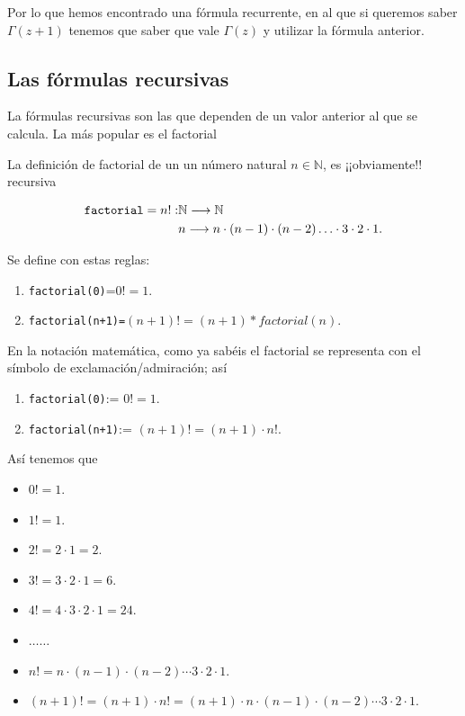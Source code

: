 \documentclass[
]{article}
\providecommand{\tightlist}{%
  \setlength{\itemsep}{0pt}\setlength{\parskip}{0pt}}
\begin{document}
Por lo que hemos encontrado una fórmula recurrente, en al que si
queremos saber \(\Gamma(z+1)\) tenemos que saber que vale \(\Gamma(z)\)
y utilizar la fórmula anterior.

\hypertarget{las-fuxf3rmulas-recursivas}{%
\subsection{Las fórmulas recursivas}\label{las-fuxf3rmulas-recursivas}}

La fórmulas recursivas son las que dependen de un valor anterior al que
se calcula. La más popular es el factorial

La definición de factorial de un un número natural \(n\in\mathbb{N}\),
es ¡¡obviamente!! recursiva

\[
\begin{aligned}
\verb+factorial+ = n!: & \mathbb{N} \longrightarrow  \mathbb{N}\\
& n \longrightarrow  n\cdot (n-1)\cdot (n-2) \ldots \cdot 3\cdot 2\cdot 1.
\end{aligned}
\]

Se define con estas reglas:

\begin{enumerate}
\def\labelenumi{\arabic{enumi}.}
\tightlist
\item
  \texttt{factorial(0)}=\(0!=1\).
\item
  \texttt{factorial(n+1)=}\((n+1)!=(n+1)*factorial(n).\)
\end{enumerate}

En la notación matemática, como ya sabéis el factorial se representa con
el símbolo de exclamación/admiración; así

\begin{enumerate}
\def\labelenumi{\arabic{enumi}.}
\tightlist
\item
  \texttt{factorial(0)}:= \(0!=1\).
\item
  \texttt{factorial(n+1)}:= \((n+1)!=(n+1)\cdot n!\).
\end{enumerate}

Así tenemos que

\begin{itemize}
\tightlist
\item
  \(0!=1.\)
\item
  \(1!=1.\)
\item
  \(2!= 2\cdot 1= 2.\)
\item
  \(3!=3\cdot 2\cdot 1= 6.\)
\item
  \(4!=4\cdot 3\cdot 2\cdot 1 =24.\)
\item
  \(\ldots \ldots\)
\item
  \(n!= n\cdot (n-1) \cdot (n-2) \cdots 3\cdot 2\cdot 1.\)
\item
  \((n+1)!= (n+1)\cdot n!= (n+1)\cdot n\cdot (n-1) \cdot (n-2) \cdots 3\cdot 2\cdot 1.\)
\end{itemize}
\end{document}
